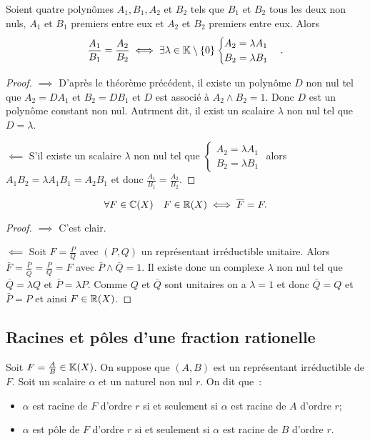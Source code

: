 \begin{theo}\label{theo:thm3}
  Soient quatre polynômes $A_1,B_1,A_2$ et $B_2$ tels que $B_1$ et $B_2$ tous les deux non nuls, $A_1$ et $B_1$ premiers entre eux et $A_2$ et $B_2$ premiers entre eux. Alors
  \begin{equation}
    \frac{A_1}{B_1}=\frac{A_2}{B_2} \iff \exists \lambda \in \mathbb{K}\setminus\{0\} \begin{cases} A_2=\lambda A_1 \\ B_2 = \lambda B_1 \end{cases}.
  \end{equation}
\end{theo}
\begin{proof}
  $\implies$ D'après le théorème précédent, il existe un polynôme $D$ non nul tel que $A_2=D A_1$ et $B_2=DB_1$ et $D$ est associé à  $A_2 \wedge B_2=1$. Donc $D$ est un polynôme constant non nul. Autrment dit, il exist un scalaire $\lambda$ non nul tel que $D=\lambda$.

  $\impliedby$ S'il existe un scalaire $\lambda$ non nul tel que $\begin{cases} A_2=\lambda A_1 \\ B_2 = \lambda B_1 \end{cases}$ alors $A_1B_2=\lambda A_1B_1=A_2B_1$ et donc $\frac{A_1}{B_1}=\frac{A_2}{B_2}$.
\end{proof}

\begin{prop}
  \begin{equation}
    \forall F \in \mathbb{C}(X) \quad F \in \mathbb{R}(X) \iff \overline{F}=F.
  \end{equation}
\end{prop}
\begin{proof}
  $\implies$ C'est clair.

  $\impliedby$ Soit $F=\frac{P}{Q}$ avec $(P,Q)$ un représentant irréductible unitaire. Alors $\bar{F}=\frac{\bar{P}}{\bar{Q}}=\frac{P}{Q}=F$ avec $\bar{P}\wedge \bar{Q} =1$. Il existe donc un complexe $\lambda$ non nul tel que $\bar{Q}=\lambda Q$ et $\bar{P}=\lambda P$. Comme $Q$ et $\bar{Q}$ sont unitaires on a $\lambda=1$ et donc $\bar{Q}=Q$ et $\bar{P}=P$ et ainsi $F \in \mathbb{R}(X)$.
\end{proof}

\subsection{Racines et pôles d'une fraction rationelle}

\begin{defdef}
  Soit $F=\frac{A}{B} \in \mathbb{K}(X)$. On suppose que $(A,B)$ est un représentant irréductible de $F$. Soit un scalaire $\alpha$ et un naturel non nul $r$. On dit que~:
  \begin{itemize}
  \item $\alpha$ est racine de $F$ d'ordre $r$ si et seulement si $\alpha$ est racine de $A$ d'ordre $r$;
  \item $\alpha$ est pôle de $F$ d'ordre $r$ si et seulement si $\alpha$ est racine de $B$ d'ordre $r$.
  \end{itemize}
\end{defdef}

